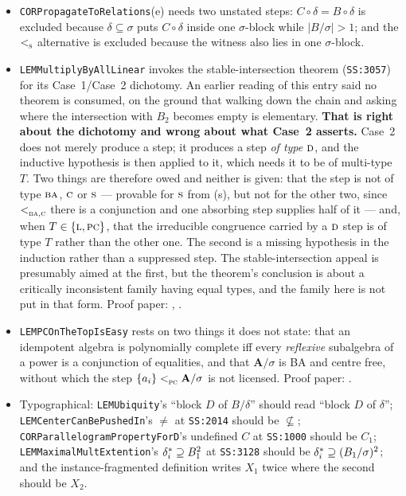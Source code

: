 \begin{itemize}
  absorb. Nothing says so.
\item \texttt{CORPropagateToRelations}(e) needs two unstated steps:
  $C\circ\delta=B\circ\delta$ is excluded because $\delta\subseteq\sigma$ puts
  $C\circ\delta$ inside one $\sigma$-block while $|B/\sigma|>1$; and the
  $<_{\textup{\textsc{s}}}^{}$ alternative is excluded because the witness also lies in one
  $\sigma$-block.
\item \texttt{LEMMultiplyByAllLinear} invokes the stable-intersection theorem
  (\texttt{SS:3057}) for its Case~1/Case~2 dichotomy. An earlier reading of
  this entry said no theorem is consumed, on the ground that walking down the
  chain and asking where the intersection with $B_{2}$ becomes empty is
  elementary. \textbf{That is right about the dichotomy and wrong about what
  Case~2 asserts.} Case~2 does not merely produce a step; it produces a step
  \emph{of type $\textup{\textsc{d}}$}, and the inductive hypothesis is then applied to it,
  which needs it to be of multi-type $T$. Two things are therefore owed and
  neither is given: that the step is not of type $\textup{\textsc{ba}}$, $\textup{\textsc{c}}$ or $\textup{\textsc{s}}$ ---
  provable for $\textup{\textsc{s}}$ from (s), but not for the
  other two, since $<_{\textup{\textsc{ba}},\textup{\textsc{c}}}^{}$ there is a conjunction and one absorbing
  step supplies half of it --- and, when $T\in\{\textup{\textsc{l}},\textup{\textsc{pc}}\}$, that the
  irreducible congruence carried by a $\textup{\textsc{d}}$ step is of type $T$ rather than the
  other one. The second is a missing hypothesis in the induction rather than a
  suppressed step. The stable-intersection appeal is presumably aimed at the
  first, but the theorem's conclusion is about a critically inconsistent family
  having equal types, and the family here is not put in that form.
  Proof paper: , .
\item \texttt{LEMPCOnTheTopIsEasy} rests on two things it does not state: that
  an idempotent algebra is polynomially complete iff every \emph{reflexive}
  subalgebra of a power is a conjunction of equalities, and that
  $\mathbf A/\sigma$ is BA and centre free, without which the step
  $\{a_{i}\}<_{\textup{\textsc{pc}}}^{}\mathbf A/\sigma$ is not licensed. Proof paper:
  .
\item Typographical: \texttt{LEMUbiquity}'s ``block $D$ of $B/\delta$'' should
  read ``block $D$ of $\delta$''; \texttt{LEMCenter\brk CanBePushedIn}'s $\neq$ at
  \texttt{SS:2014} should be $\not\subseteq$;
  \texttt{CORParallelogramPropertyForD}'s undefined $C$ at \texttt{SS:1000}
  should be $C_{1}$; \texttt{LEMMaximalMultExtention}'s
  $\delta_{i}^{*}\supseteq B_{1}^{2}$ at \texttt{SS:3128} should be
  $\delta_{i}^{*}\supseteq(B_{1}/\sigma)^{2}$; and the instance-fragmented
  definition writes $X_{1}$ twice where the second should be $X_{2}$.
\end{itemize}

